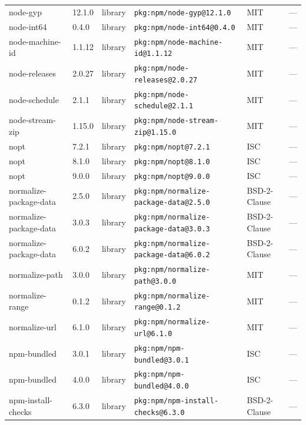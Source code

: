 \documentclass[11pt,a4paper]{article}
\begin{document}
\begin{longtable}{|p{4cm}|p{2cm}|p{1.6cm}|p{5cm}|p{1.5cm}|p{3.5cm}|}
\raggedright node-gyp & 12.1.0 & library & \small\texttt{pkg:npm/node-gyp@12.1.0} & MIT & \small — \\
\raggedright node-int64 & 0.4.0 & library & \small\texttt{pkg:npm/node-int64@0.4.0} & MIT & \small — \\
\raggedright node-machine-id & 1.1.12 & library & \small\texttt{pkg:npm/node-machine-id@1.1.12} & MIT & \small — \\
\raggedright node-releases & 2.0.27 & library & \small\texttt{pkg:npm/node-releases@2.0.27} & MIT & \small — \\
\raggedright node-schedule & 2.1.1 & library & \small\texttt{pkg:npm/node-schedule@2.1.1} & MIT & \small — \\
\raggedright node-stream-zip & 1.15.0 & library & \small\texttt{pkg:npm/node-stream-zip@1.15.0} & MIT & \small — \\
\raggedright nopt & 7.2.1 & library & \small\texttt{pkg:npm/nopt@7.2.1} & ISC & \small — \\
\raggedright nopt & 8.1.0 & library & \small\texttt{pkg:npm/nopt@8.1.0} & ISC & \small — \\
\raggedright nopt & 9.0.0 & library & \small\texttt{pkg:npm/nopt@9.0.0} & ISC & \small — \\
\raggedright normalize-package-data & 2.5.0 & library & \small\texttt{pkg:npm/normalize-package-data@2.5.0} & BSD-2-Clause & \small — \\
\raggedright normalize-package-data & 3.0.3 & library & \small\texttt{pkg:npm/normalize-package-data@3.0.3} & BSD-2-Clause & \small — \\
\raggedright normalize-package-data & 6.0.2 & library & \small\texttt{pkg:npm/normalize-package-data@6.0.2} & BSD-2-Clause & \small — \\
\raggedright normalize-path & 3.0.0 & library & \small\texttt{pkg:npm/normalize-path@3.0.0} & MIT & \small — \\
\raggedright normalize-range & 0.1.2 & library & \small\texttt{pkg:npm/normalize-range@0.1.2} & MIT & \small — \\
\raggedright normalize-url & 6.1.0 & library & \small\texttt{pkg:npm/normalize-url@6.1.0} & MIT & \small — \\
\raggedright npm-bundled & 3.0.1 & library & \small\texttt{pkg:npm/npm-bundled@3.0.1} & ISC & \small — \\
\raggedright npm-bundled & 4.0.0 & library & \small\texttt{pkg:npm/npm-bundled@4.0.0} & ISC & \small — \\
\raggedright npm-install-checks & 6.3.0 & library & \small\texttt{pkg:npm/npm-install-checks@6.3.0} & BSD-2-Clause & \small — \\

\end{longtable}
\end{document}
